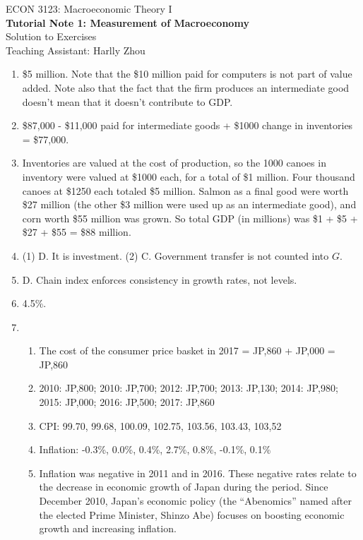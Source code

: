 \documentclass[12pt]{article}
\numberwithin{equation}{section}
\begin{document}
\begin{center}
    ECON 3123: Macroeconomic Theory I\\
    {\large \textbf{Tutorial Note 1: Measurement of Macroeconomy}}\\
    Solution to Exercises\\
    Teaching Assistant: Harlly Zhou
\end{center}

\begin{enumerate}[label=\arabic*.]
    \item \$5 million. Note that the \$10 million paid for computers is not part of value added. Note also that the fact that the firm produces an intermediate good doesn't mean that it doesn't contribute to GDP.
    \item \$87,000 - \$11,000 paid for intermediate goods + \$1000 change in inventories = \$77,000.
    \item Inventories are valued at the cost of production, so the 1000 canoes in inventory were valued at \$1000 each, for a total of \$1 million. Four thousand canoes at \$1250 each totaled \$5 million. Salmon as a final good were worth \$27 million (the other \$3 million were used up as an intermediate good), and corn worth \$55 million was grown. So total GDP (in millions) was \$1 + \$5 + \$27 + \$55 = \$88 million. 
    \item (1) D. It is investment. (2) C. Government transfer is not counted into $G$.
    \item D. Chain index enforces consistency in growth rates, not levels.
    \item 4.5\%.
    \item \begin{enumerate}[label=\alph*.]
        \item The cost of the consumer price basket in 2017 = JP,860 + JP,000 = JP,860
        \item 2010: JP,800; 2010: JP,700; 2012: JP,700; 2013: JP,130; 2014: JP,980; 2015: JP,000; 2016: JP,500; 2017: JP,860
        \item CPI: 99.70, 99.68, 100.09, 102.75, 103.56, 103.43, 103,52
        \item Inflation: -0.3\%, 0.0\%, 0.4\%, 2.7\%, 0.8\%, -0.1\%, 0.1\%
        \item Inflation was negative in 2011 and in 2016. These negative rates relate to the decrease in economic growth of Japan during the period. Since December 2010, Japan's economic policy (the ``Abenomics'' named after the elected Prime Minister, Shinzo Abe) focuses on boosting economic growth and increasing inflation.

\end{enumerate}
\end{enumerate}
\end{document}
